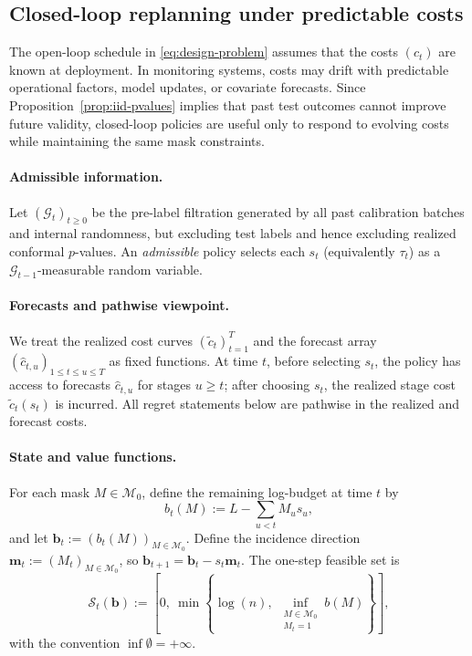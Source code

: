 \documentclass{uai2026} %
\newcommand{\1}{\mathbf{1}}
\newcommand{\scalt}{\mathcal{S}_{t}}
\newcommand{\G}{\mathcal{G}}
\newcommand{\mcal}{\mathcal{M}}
\begin{document}
\subsection{Closed-loop replanning under predictable costs}
\label{sec:replanning}
The open-loop schedule in \eqref{eq:design-problem} assumes that the costs $(c_t)$ are known at deployment.
In monitoring systems, costs may drift with predictable operational factors, model updates, or covariate forecasts.
Since Proposition~\ref{prop:iid-pvalues} implies that past test outcomes cannot improve future validity, closed-loop policies are useful only to respond to evolving costs while maintaining the same mask constraints.

\paragraph{Admissible information.}
Let $(\G_t)_{t\ge 0}$ be the pre-label filtration generated by all past calibration batches and internal randomness, but excluding test labels and hence excluding realized conformal $p$-values.
An \emph{admissible} policy selects each $s_t$ (equivalently $\tau_t$) as a $\G_{t-1}$-measurable random variable.

\paragraph{Forecasts and pathwise viewpoint.}
We treat the realized cost curves $(\tilde{c}_t)_{t=1}^{T}$ and the forecast array $(\hat{c}_{t,u})_{1 \le t \le u \le T}$ as fixed functions.
At time $t$, before selecting $s_t$, the policy has access to forecasts $\hat{c}_{t,u}$ for stages $u\ge t$; after choosing $s_t$, the realized stage cost $\tilde{c}_t(s_t)$ is incurred.
All regret statements below are pathwise in the realized and forecast costs.

\paragraph{State and value functions.}
For each mask $M\in\mcal_{0}$, define the remaining log-budget at time $t$ by
\begin{equation}
  \label{eq:budget-state-sec4}
  b_t(M) := L - \sum_{u < t} M_u s_u,
\end{equation}
and let $\mathbf{b}_t := (b_t(M))_{M\in\mcal_{0}}$.
Define the incidence direction $\mathbf{m}_t := (M_t)_{M\in\mcal_{0}}$, so $\mathbf{b}_{t+1}=\mathbf{b}_t-s_t \mathbf{m}_t$.
The one-step feasible set is
\begin{equation}
  \label{eq:Scal-sec4}
  \scalt(\mathbf{b})
  :=
  \left[0,\ \min\left\{\log(n),\ \inf_{\substack{M\in\mcal_{0}\\ M_t=1}} b(M)\right\}\right],
\end{equation}
with the convention $\inf\emptyset=+\infty$.
\end{document}
